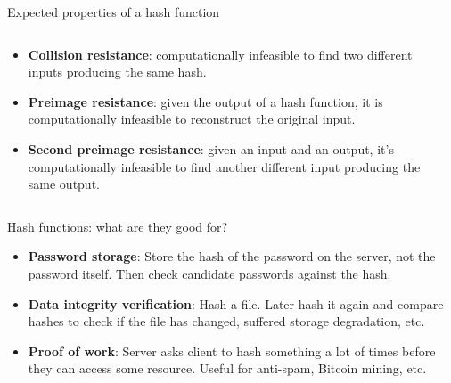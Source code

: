 \documentclass[aspectratio=169, lualatex, handout]{beamer}
\begin{document}
\begin{frame}{Expected properties of a hash function}
	\begin{columns}[c]
		\begin{column}{0.6\textwidth}
			\begin{itemize}
				\item \textbf{Collision resistance}: computationally infeasible to find
				      two different inputs producing the same hash.
				\item \textbf{Preimage resistance}: given the output of a hash function,
				      it is computationally infeasible to reconstruct the original input.
				\item \textbf{Second preimage resistance}: given an input and an output,
				      it's computationally infeasible to find another different input
				      producing the same output.
			\end{itemize}
		\end{column}
		\begin{column}{0.4\textwidth}
		\end{column}
	\end{columns}
\end{frame}

\begin{frame}{Hash functions: what are they good for?}
	\begin{itemize}[<+->]
		\item \textbf{Password storage}: Store the hash of the password on the server,
		      not the password itself. Then check candidate passwords against the hash.
		\item \textbf{Data integrity verification}: Hash a file. Later hash it
		      again and compare hashes to check if the file has changed, suffered storage
		      degradation, etc.
		\item \textbf{Proof of work}: Server asks client to hash something a lot of
		      times before they can access some resource. Useful for anti-spam, Bitcoin
		      mining, etc.
	\end{itemize}
\end{frame}
\end{document}
